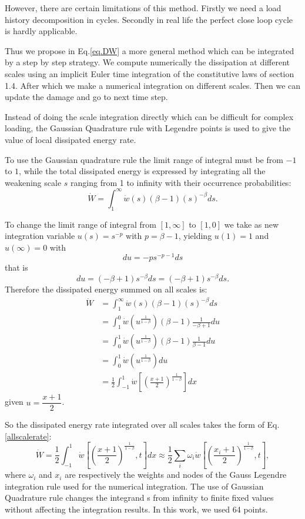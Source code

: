 \documentclass[3p,times,number,review]{elsarticle}
\begin{document}
However, there are certain limitations of this method. Firstly we need a load history decomposition in cycles. Secondly in real life the perfect close loop cycle is hardly applicable.

Thus we propose in Eq.\eqref{eq.DW} a more general method which can be integrated by a step by step strategy. We compute numerically the dissipation at different scales using an implicit Euler time integration of the constitutive laws of section 1.4. After which we make a numerical integration on different scales. Then we can update the damage and go to next time step. 

Instead of doing the scale integration directly which can be difficult for complex loading, the Gaussian Quadrature rule with Legendre points is used to give the value of local dissipated energy rate.

To use the Gaussian quadrature rule the limit range of integral must be from $-1$ to $1$, while the total dissipated energy  is expressed by integrating all the weakening scale $s$ ranging from 1 to infinity with their occurrence probabilities:
$$\dot{W}=\int_{1}^{\infty}\dot{w}(s) (\beta-1)(s)^{-\beta}ds.$$

\noindent
To change the limit range of integral from $[1,\infty]$ to $[1,0]$ we take as new integration variable
$u(s)= s^{-p}$ with $p=\beta-1$, yielding $u(1)=1$ and  $u(\infty)=0$ with
$$du=-ps^{-p-1}ds$$ 
that is
$$du=(-\beta+1) s^{-\beta}ds=(-\beta+1)s^{-\beta} ds.$$
Therefore the dissipated energy summed on all scales is:
\begin{equation}
\begin{split}
\dot{W}&=\int_{1}^{\infty}\dot{w}(s) (\beta-1)(s)^{-\beta}ds
\\&=\int_{1}^{0}\dot{w}\left( u^{\frac{1}{1-\beta}}\right) (\beta-1) \frac{1}{-\beta+1}du
\\&=\int_{0}^{1}\dot{w}\left( u^{\frac{1}{1-\beta}}\right) (\beta-1) \frac{1}{\beta-1}du
\\&=\int_{0}^{1}\dot{w}\left( u^{\frac{1}{1-\beta}}\right)du
\\&=\frac{1}{2}\int_{-1}^{1}\dot{w}\left[  \left( \frac{x+1}{2}\right) ^{\frac{1}{1-\beta}}\right] dx
\end{split}
\label{allscale}
\end{equation}
given $u=\dfrac{x+1}{2}$.

So the dissipated energy rate integrated over all scales takes the form of Eq.\eqref{allscalerate}:
\begin{equation}
\dot{W}=\frac{1}{2}\int_{-1}^{1}\dot{w}\left[  \left( \frac{x+1}{2}\right) ^{\frac{1}{1-\beta}},t\right] dx\approx\frac{1}{2}\sum_{i}\omega_i\dot{w}\left[  \left( \frac{x_i+1}{2}\right) ^{\frac{1}{1-\beta}},t\right],
\label{allscalerate}
\end{equation}
where $\omega_i$ and $x_i$ are respectively the weights and nodes of the Gauss Legendre integration rule used for the numerical integration. The use of Gaussian Quadrature rule changes the integrand s from infinity to finite fixed values without affecting the integration results. In this work, we used 64 points\cite{legendre}.
\end{document}
